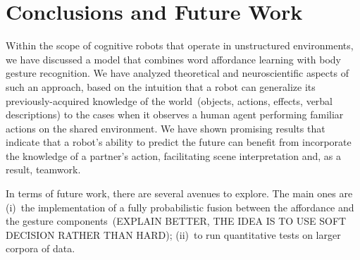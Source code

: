 
\section{Conclusions and Future Work}

Within the scope of cognitive robots that operate in unstructured environments, we have discussed a model that combines word affordance learning with body gesture recognition. We have analyzed theoretical and neuroscientific aspects of such an approach, based on the intuition that a robot can generalize its previously-acquired knowledge of the world~(objects, actions, effects, verbal descriptions) to the cases when it observes a human agent performing familiar actions on the shared \hr{} environment. We have shown promising results that indicate that a robot's ability to predict the future can benefit from incorporate the knowledge of a partner's action, facilitating scene interpretation and, as a result, teamwork.

In terms of future work, there are several avenues to explore. The main ones are (i)~the implementation of a fully probabilistic fusion between the affordance and the gesture components~(EXPLAIN BETTER, THE IDEA IS TO USE SOFT DECISION RATHER THAN HARD); (ii)~to run quantitative tests on larger corpora of \hr{} data.
